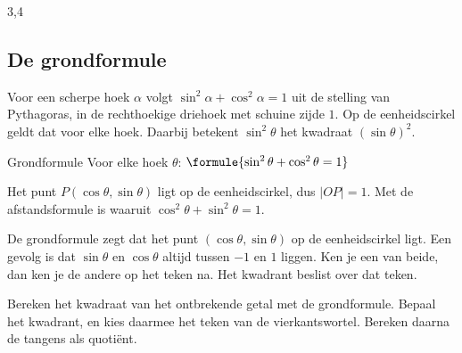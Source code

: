 \begin{alleenvoor}{3,4}
\subsection{De grondformule}

Voor een scherpe hoek $\alpha$ volgt $\sin^2\alpha + \cos^2\alpha = 1$ uit de stelling van Pythagoras, in de rechthoekige driehoek met schuine zijde $1$. Op de eenheidscirkel geldt dat voor elke hoek. Daarbij betekent $\sin^2\theta$ het kwadraat $(\sin\theta)^2$.

\begin{theorie}
\begin{stelling}{Grondformule}
Voor elke hoek $\theta$: \quad $\formule{\sin^2\theta + \cos^2\theta = 1}$
\end{stelling}
\begin{bewijs}
Het punt $P(\cos\theta, \sin\theta)$ ligt op de eenheidscirkel, dus $|OP| = 1$. Met de afstandsformule is
waaruit $\cos^2\theta + \sin^2\theta = 1$.
\end{bewijs}
\end{theorie}

De grondformule zegt dat het punt $(\cos\theta, \sin\theta)$ op de eenheidscirkel ligt. Een gevolg is dat $\sin\theta$ en $\cos\theta$ altijd tussen $-1$ en $1$ liggen. Ken je een van beide, dan ken je de andere op het teken na. Het kwadrant beslist over dat teken.


\begin{werkwijze}
Bereken het kwadraat van het ontbrekende getal met de grondformule. Bepaal het kwadrant, en kies daarmee het teken van de vierkantswortel. Bereken daarna de tangens als quotiënt.
\end{werkwijze}


\end{alleenvoor}
